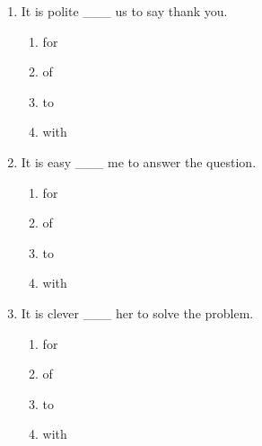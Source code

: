 \documentclass[11pt,a4paper]{ctexart}
\begin{document}
\begin{enumerate}[leftmargin=*,itemsep=4pt]
\begin{enumerate}[label=\Alph*.,leftmargin=2em,itemsep=1pt,topsep=2pt]
\item with
\end{enumerate}
\item It is polite \_\_\_ us to say thank you.
\begin{enumerate}[label=\Alph*.,leftmargin=2em,itemsep=1pt,topsep=2pt]
\item for
\item of
\item to
\item with
\end{enumerate}
\item It is easy \_\_\_ me to answer the question.
\begin{enumerate}[label=\Alph*.,leftmargin=2em,itemsep=1pt,topsep=2pt]
\item for
\item of
\item to
\item with
\end{enumerate}
\item It is clever \_\_\_ her to solve the problem.
\begin{enumerate}[label=\Alph*.,leftmargin=2em,itemsep=1pt,topsep=2pt]
\item for
\item of
\item to
\item with
\end{enumerate}
\end{enumerate}
\end{document}
